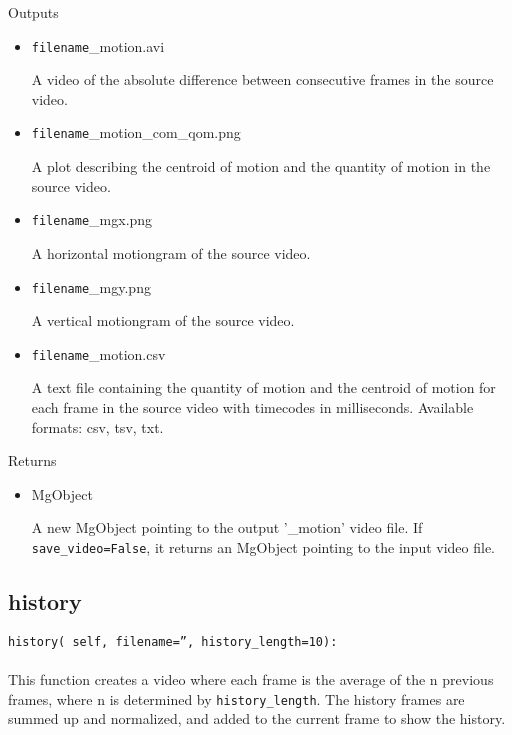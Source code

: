 \documentclass[9pt]{extarticle}
\def\code#1{\texttt{#1}}
\begin{document}
\noindent Outputs

\begin{itemize}

\item \code{filename}\_motion.avi

A video of the absolute difference between consecutive frames 
in the source video. 

\item \code{filename}\_motion\_com\_qom.png

A plot describing the centroid of motion and the quantity of 
motion in the source video.

\item \code{filename}\_mgx.png

A horizontal motiongram of the source video.

\item \code{filename}\_mgy.png

A vertical motiongram of the source video.

\item \code{filename}\_motion.csv

A text file containing the quantity of motion and the centroid 
of motion for each frame in the source video with timecodes in 
milliseconds. Available formats: csv, tsv, txt.

\end{itemize}

\noindent Returns

\begin{itemize}
\item MgObject 

A new MgObject pointing to the output '\_motion' video file. 
If \code{save\_video=False}, it returns an MgObject 
pointing to the input video file.
\end{itemize}


\subsection{history}

\code{history(
    self, 
    filename='', 
    history\_length=10):}
\\\\
This function  creates a video where each frame is the average of the 
n previous frames, where n is determined by \code{history\_length}.
The history frames are summed up and normalized, and added to the 
current frame to show the history.
\\\\
\end{document}
